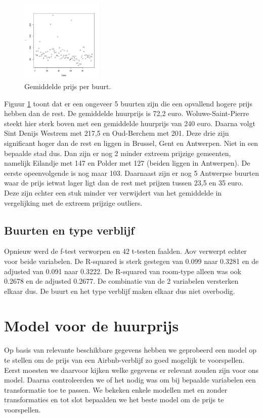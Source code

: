 \documentclass[a4paper,kulak]{kulakarticle} %
\begin{document}
\begin{figure}
	\begin{center}
		\includegraphics[width=0.35\textwidth]{pn.jpg}
	\end{center}
	\caption{Gemiddelde prijs per buurt.}
	\label{fig:pn}
\end{figure}

Figuur \ref{fig:pn} toont dat er een ongeveer 5 buurten zijn die een opvallend hogere prijs hebben dan de rest.
De gemiddelde huurprijs is 72,2 euro.
Woluwe-Saint-Pierre steekt hier sterk boven met een gemiddelde huurprijs van 240 euro.
Daarna volgt Sint Denijs Westrem met 217,5 en Oud-Berchem met 201.
Deze drie zijn significant hoger dan de rest en liggen in Brussel, Gent en Antwerpen. Niet in een bepaalde stad dus.
Dan zijn er nog 2 minder extreem prijzige gemeenten, namelijk Eilandje met 147 en Polder met 127 (beiden liggen in Antwerpen). De eerste opeenvolgende is nog maar 103.
Daarnaast zijn er nog 5 Antwerpse buurten waar de prijs ietwat lager ligt dan de rest met prijzen tussen 23,5 en 35 euro.
Deze zijn echter een stuk minder ver verwijdert van het gemiddelde in vergelijking met de extreem prijzige outliers.

\subsection{Buurten en type verblijf}
Opnieuw werd de f-test verworpen en 42 t-testen faalden.
Aov verwerpt echter voor beide variabelen.
De R-squared is sterk gestegen van 0.099 naar 0.3281 en de adjusted van 0.091 naar 0.3222.
De R-squared van room-type alleen was ook 0.2678 en de adjusted 0.2677. De combinatie van de 2 variabelen versterken elkaar dus.
De buurt en het type verblijf maken elkaar dus niet overbodig.




\section{Model voor de huurprijs} \label{sec:mh}
Op basis van relevante beschikbare gegevens hebben we geprobeerd een model op te stellen om de prijs van een Airbnb-verblijf zo goed mogelijk te voorspellen. Eerst moesten we daarvoor kijken welke gegevens er relevant zouden zijn voor ons model. Daarna controleerden we of het nodig was om bij bepaalde variabelen een transformatie toe te passen. We bekeken enkele modellen met en zonder transformaties en tot slot bepaalden we het beste model om de prijs te voorspellen.
\end{document}
